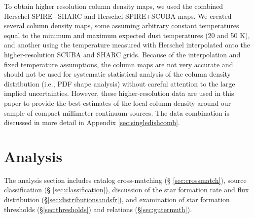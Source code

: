 \documentclass[twocolumn]{aastex61}
\begin{document}
To obtain higher resolution column density maps, we used the combined
Herschel-SPIRE+SHARC and Herschel-SPIRE+SCUBA maps.
We created several column density maps, some assuming arbitrary constant
temperatures equal to the minimum and maximum expected dust temperatures (20
and 50 K), and another using the temperature measured with Herschel
interpolated onto the higher-resolution SCUBA and SHARC grids.  Because of the
interpolation and fixed temperature assumptions, the column maps are not very
accurate and should not be used for systematic statistical analysis of the
column density distribution (i.e., PDF shape analysis) without careful
attention to
the large implied
uncertainties.  However, these higher-resolution data are used in this paper
to provide the best estimates of the local column density around our sample
of compact millimeter continuum sources.
The data combination is discussed in more detail in Appendix
\ref{sec:singledishcomb}.

\section{Analysis}
\label{sec:analysis}
The analysis section includes catalog cross-matching (\S
\ref{sec:crossmatch}), source classification (\S
\ref{sec:classification}), discussion of the star formation rate and flux
distribution (\S \ref{sec:distributionsandsfr}), and examination of star formation
thresholds (\S \ref{sec:thresholds}) and relations (\S \ref{sec:gutermuth}). 
\end{document}
